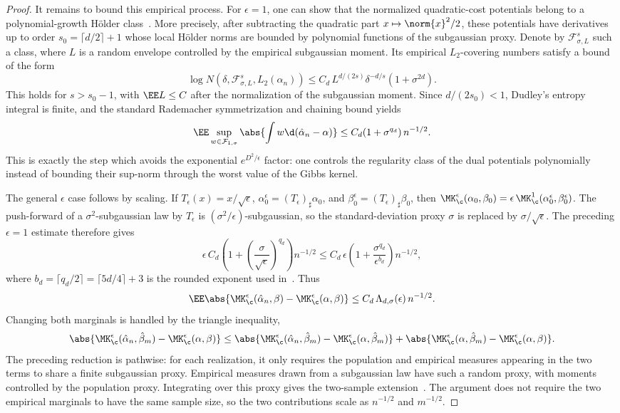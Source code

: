 \begin{proof}
	It remains to bound this empirical process. For \(\epsilon=1\), one can show that the normalized quadratic-cost potentials belong to a polynomial-growth H\"older class~\cite{mena2019statistical}. More precisely, after subtracting the quadratic part \(x\mapsto\norm{x}^2/2\), these potentials have derivatives up to order \(s_0=\lceil d/2\rceil+1\) whose local H\"older norms are bounded by polynomial functions of the subgaussian proxy. Denote by \(\mathcal F^s_{\sigma,L}\) such a class, where \(L\) is a random envelope controlled by the empirical subgaussian moment. Its empirical \(L_2\)-covering numbers satisfy a bound of the form
	\[
		\log N(\delta,\mathcal F^s_{\sigma,L},L_2(\alpha_n))
		\leq
		C_d\,L^{d/(2s)}\delta^{-d/s}(1+\sigma^{2d}).
	\]
	This holds for \(s>s_0-1\), with \(\EE L\leq C\) after the normalization of the subgaussian moment. Since \(d/(2s_0)<1\), Dudley's entropy integral is finite, and the standard Rademacher symmetrization and chaining bound yields
	\[
	\EE\sup_{w\in\mathcal F_{1,\sigma}}
	\abs{\int w\d(\hat\alpha_n-\alpha)}
	\leq
	C_d(1+\sigma^{q_d})\,n^{-1/2}.
	\]
	This is exactly the step which avoids the exponential \(e^{D^2/\epsilon}\) factor: one controls the regularity class of the dual potentials polynomially instead of bounding their sup-norm through the worst value of the Gibbs kernel.

	The general \(\epsilon\) case follows by scaling. If \(T_\epsilon(x)=x/\sqrt\epsilon\), \(\alpha_0^\epsilon=(T_\epsilon)_\sharp\alpha_0\), and \(\beta_0^\epsilon=(T_\epsilon)_\sharp\beta_0\), then
	$\MK_\c^\epsilon(\alpha_0,\beta_0) = \epsilon\,\MK_\c^1(\alpha_0^\epsilon,\beta_0^\epsilon)$.
	The push-forward of a \(\sigma^2\)-subgaussian law by \(T_\epsilon\) is \((\sigma^2/\epsilon)\)-subgaussian, so the standard-deviation proxy \(\sigma\) is replaced by \(\sigma/\sqrt\epsilon\). The preceding \(\epsilon=1\) estimate therefore gives
	\[
	\epsilon\,
	C_d
	\left(
		1+
		\left(\frac{\sigma}{\sqrt\epsilon}\right)^{q_d}
	\right)n^{-1/2}
	\leq
	C_d\,\epsilon
	\left(
		1+\frac{\sigma^{q_d}}{\epsilon^{b_d}}
	\right)n^{-1/2},
	\]
	where \(b_d=\lceil q_d/2\rceil=\lceil5d/4\rceil+3\) is the rounded exponent used in~\cite{mena2019statistical}. Thus
	\[
	\EE\abs{\MK_\c^\epsilon(\hat\alpha_n,\beta)-\MK_\c^\epsilon(\alpha,\beta)}
	\leq
	C_d\,\Lambda_{d,\sigma}(\epsilon)\,n^{-1/2}.
	\]
	Changing both marginals is handled by the triangle inequality,
	\[
	\abs{\MK_\c^\epsilon(\hat\alpha_n,\hat\beta_m)-\MK_\c^\epsilon(\alpha,\beta)}
	\leq
	\abs{\MK_\c^\epsilon(\hat\alpha_n,\hat\beta_m)-\MK_\c^\epsilon(\alpha,\hat\beta_m)}
	+
	\abs{\MK_\c^\epsilon(\alpha,\hat\beta_m)-\MK_\c^\epsilon(\alpha,\beta)}.
	\]
	The preceding reduction is pathwise: for each realization, it only requires the population and empirical measures appearing in the two terms to share a finite subgaussian proxy. Empirical measures drawn from a subgaussian law have such a random proxy, with moments controlled by the population proxy. Integrating over this proxy gives the two-sample extension~\cite{mena2019statistical}. The argument does not require the two empirical marginals to have the same sample size, so the two contributions scale as \(n^{-1/2}\) and \(m^{-1/2}\).


\end{proof}

